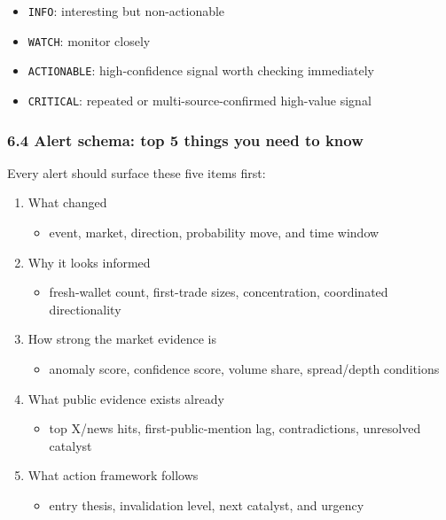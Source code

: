 \documentclass[
]{article}
\providecommand{\tightlist}{%
  \setlength{\itemsep}{0pt}\setlength{\parskip}{0pt}}
\begin{document}
\begin{itemize}
\tightlist
\item
  \texttt{INFO}: interesting but non-actionable
\item
  \texttt{WATCH}: monitor closely
\item
  \texttt{ACTIONABLE}: high-confidence signal worth checking immediately
\item
  \texttt{CRITICAL}: repeated or multi-source-confirmed high-value
  signal
\end{itemize}

\subsubsection{6.4 Alert schema: top 5 things you need to
know}\label{64-alert-schema-top-5-things-you-need-to-know}

Every alert should surface these five items first:

\begin{enumerate}
\def\labelenumi{\arabic{enumi}.}
\item
  What changed

  \begin{itemize}
  \tightlist
  \item
    event, market, direction, probability move, and time window
  \end{itemize}
\item
  Why it looks informed

  \begin{itemize}
  \tightlist
  \item
    fresh-wallet count, first-trade sizes, concentration, coordinated
    directionality
  \end{itemize}
\item
  How strong the market evidence is

  \begin{itemize}
  \tightlist
  \item
    anomaly score, confidence score, volume share, spread/depth
    conditions
  \end{itemize}
\item
  What public evidence exists already

  \begin{itemize}
  \tightlist
  \item
    top X/news hits, first-public-mention lag, contradictions,
    unresolved catalyst
  \end{itemize}
\item
  What action framework follows

  \begin{itemize}
  \tightlist
  \item
    entry thesis, invalidation level, next catalyst, and urgency
  \end{itemize}
\end{enumerate}
\end{document}

